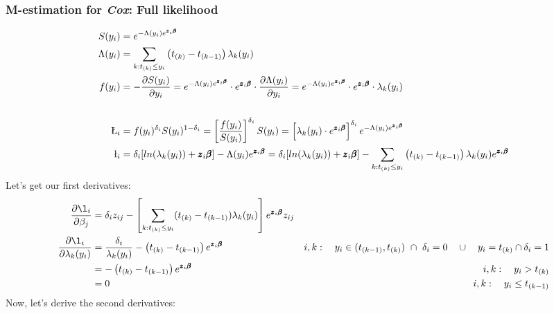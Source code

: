 \documentclass[]{article}
\begin{document}
\subsubsection{M-estimation for \emph{Cox}: Full likelihood}
$$
  \begin{aligned}
    S(y_i) &=  e^{-\Lambda(y_i) e^{\pmb{z}_i\pmb{\beta}}} \\
    \Lambda(y_i)  &= \sum_{k: t_{(k)}\leq y_i} \left(t_{(k)} - t_{(k-1)}\right) \lambda_k(y_i)\\
    f(y_i) &= -\frac{\partial S(y_i)}{\partial y_i} =   e^{-\Lambda(y_i) e^{\pmb{z}_i\pmb{\beta}}} \cdot e^{\pmb{z}_i\pmb{\beta}} \cdot \frac{\partial \Lambda(y_i)}{\partial y_i} =   e^{-\Lambda(y_i) e^{\pmb{z}_i\pmb{\beta}}} \cdot e^{\pmb{z}_i\pmb{\beta}} \cdot \lambda_k(y_i) \\\\
    \L_i  &= f(y_i)^{\delta_i} S(y_i)^{1 - \delta_i} = \left[  \frac{f(y_i)}{S(y_i)}  \right]^{\delta_i}   S(y_i) = \left[   \lambda_k(y_i) \cdot e^{\pmb{z}_i\pmb{\beta}}   \right]^{\delta_i} e^{-\Lambda(y_i) e^{\pmb{z}_i\pmb{\beta}}}\\
    \l_i  &= \delta_i [ln(\lambda_k(y_i)) + \pmb{z}_i\pmb{\beta}] -\Lambda(y_i) e^{\pmb{z}_i\pmb{\beta}} = \delta_i [ln(\lambda_k(y_i)) + \pmb{z}_i\pmb{\beta}] -\sum_{k: t_{(k)}\leq y_i} \left(t_{(k)} - t_{(k-1)}\right) \lambda_k(y_i) e^{\pmb{z}_i\pmb{\beta}}\\
  \end{aligned}
  $$
Let's get our first derivatives:
$$
  \begin{aligned}
   \frac{\partial \l_i}{\partial \beta_j}  &= \delta_iz_{ij}  - \left[  \sum_{k: t_{(k)}\leq y_i} (t_{(k)} - t_{(k-1)}) \lambda_k(y_i)   \right]  e^{\pmb{z}_i\pmb{\beta}} z_{ij}\\
    \frac{\partial \l_i}{\partial \lambda_k(y_i)}  &= \frac{\delta_i}{\lambda_k(y_i)} -  \left(  t_{(k)} - t_{(k-1)}  \right) e^{\pmb{z}_i\pmb{\beta}}~~~~  &i,k:~~~ y_i \in (t_{(k - 1)}, t_{(k)}) ~\cap~ \delta_i = 0 ~~~  \cup   ~~~ y_i = t_{(k)} \cap \delta_i = 1\\
      &= -  \left(  t_{(k)} - t_{(k-1)}  \right) e^{\pmb{z}_i\pmb{\beta}}~~~~  &i,k:~~~y_i > t_{(k)}\\
      &= 0 ~~~~  &i,k:~~~y_i \leq t_{(k-1)}\\
  \end{aligned}
$$
Now, let's derive the second derivatives:
\end{document}
